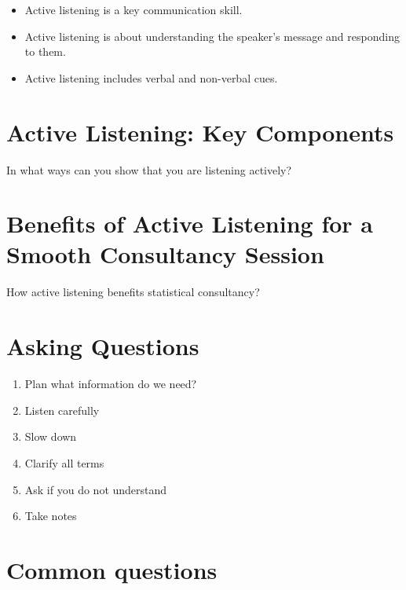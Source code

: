 \documentclass[
  letterpaper,
  DIV=11,
  numbers=noendperiod]{scrreprt}
\begin{document}
\begin{itemize}
\item
  Active listening is a key communication skill.
\item
  Active listening is about understanding the speaker's message and
  responding to them.
\item
  Active listening includes verbal and non-verbal cues.
\end{itemize}

\section{Active Listening: Key
Components}\label{active-listening-key-components}

In what ways can you show that you are listening actively?

\section{Benefits of Active Listening for a Smooth Consultancy
Session}\label{benefits-of-active-listening-for-a-smooth-consultancy-session}

How active listening benefits statistical consultancy?

\section{Asking Questions}\label{asking-questions}

\begin{enumerate}
\def\labelenumi{\arabic{enumi}.}
\item
  Plan what information do we need?
\item
  Listen carefully
\item
  Slow down
\item
  Clarify all terms
\item
  Ask if you do not understand
\item
  Take notes
\end{enumerate}

\section{Common questions}\label{common-questions}
\end{document}
